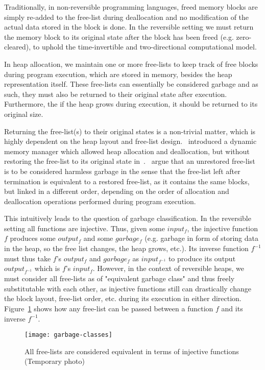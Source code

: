 Traditionally, in non-reversible programming languages, freed memory blocks are simply re-added to the free-list during deallocation and no modification of the actual data stored in the block is done. In the reversible setting we must return the memory block to its original state after the block has been freed (e.g. zero-cleared), to uphold the time-invertible and two-directional computational model. 

In heap allocation, we maintain one or more free-lists to keep track of free blocks during program execution, which are stored in memory, besides the heap representation itself. These free-lists can essentially be considered garbage and as such, they must also be returned to their original state after execution. Furthermore, the if the heap grows during execution, it should be returned to its original size.

Returning the free-list(s) to their original states is a non-trivial matter, which is highly dependent on the heap layout and free-list design.~\citeauthor{ha:heap} introduced a dynamic memory manager which allowed heap allocation and deallocation, but without restoring the free-list to its original state in~\cite{ha:heap}.~\citeauthor{ha:heap} argue that an unrestored free-list is to be considered harmless garbage in the sense that the free-list left after termination is equivalent to a restored free-list, as it contains the same blocks, but linked in a different order, depending on the order of allocation and deallocation operations performed during program execution.

This intuitively leads to the question of garbage classification. In the reversible setting all functions are injective. Thus, given some $input_f$, the injective function $f$ produces some $output_f$ and some $garbage_f$ (e.g. garbage in form of storing data in the heap, so the free list changes, the heap grows, etc.). Its inverse function $f^{-1}$ must thus take $f$'s $output_f$ and $garbage_f$ as $input_{f^{-1}}$ to produce its output $output_{f^{-1}}$ which is $f$'s $input_f$. However, in the context of reversible heaps, we must consider all free-lists as of "equivalent garbage class" and thus freely substitutable with each other, as injective functions still can drastically change the block layout, free-list order, etc. during its execution in either direction. Figure~\ref{fig:equivalent-free-lists} shows how any free-list can be passed between a function $f$ and its inverse $f^{-1}$.

\begin{figure}[ht]
\centering
\texttt{[image: garbage-classes]}
\caption{All free-lists are considered equivalent in terms of injective functions (Temporary photo)}
\label{fig:equivalent-free-lists}
\end{figure}



